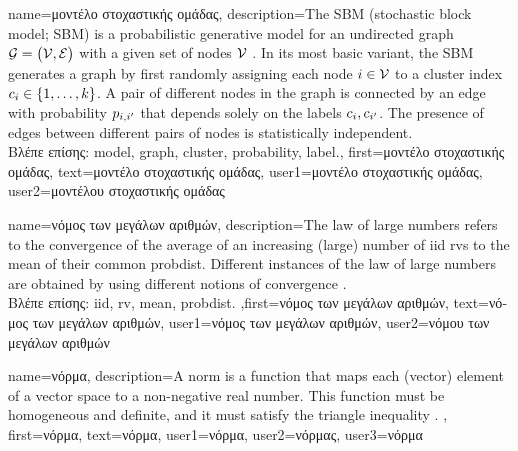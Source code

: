 {name={\foreignlanguage{greek}{μοντέλο στοχαστικής ομάδας}},
	description={The SBM (stochastic block model; SBM) is a 
		probabilistic generative \gls{model} for an undirected \gls{graph} $\mathcal{G} = \big( \mathcal{V}, \mathcal{E} \big)$ 
		with a given set of nodes $\mathcal{V}$ \cite{AbbeSBM2018}. In its most basic variant, 
		the SBM generates a \gls{graph} by first randomly assigning each node $i \in \mathcal{V}$ to 
		a \gls{cluster} index $c_{i} \in \{1,\ldots,k\}$. A pair of different nodes in the 
		\gls{graph} is connected by an edge with \gls{probability} $p_{i,i'}$ that depends 
		solely on the \gls{label}s $c_{i}, c_{i'}$. 
		The presence of edges between different pairs of 
		nodes is statistically independent.\\
		\foreignlanguage{greek}{Βλέπε επίσης:} \gls{model}, \gls{graph}, \gls{cluster}, \gls{probability}, \gls{label}.},
	first={\foreignlanguage{greek}{μοντέλο στοχαστικής ομάδας}},
	text={\foreignlanguage{greek}{μοντέλο στοχαστικής ομάδας}},
	user1={\foreignlanguage{greek}{μοντέλο στοχαστικής ομάδας}}, %
    	user2={\foreignlanguage{greek}{μοντέλου στοχαστικής ομάδας}} %
}

{name={\foreignlanguage{greek}{νόμος των μεγάλων αριθμών}},
	description={The law of large numbers refers to the 
		convergence of the average of an increasing (large) number of \gls{iid} \gls{rv}s 
		to the \gls{mean} of their common \gls{probdist}. Different instances of the 
		law of large numbers are obtained by using different notions of convergence \cite{papoulis}.\\
		\foreignlanguage{greek}{Βλέπε επίσης:} \gls{iid}, \gls{rv}, \gls{mean}, \gls{probdist}.
		},first={\foreignlanguage{greek}{νόμος των μεγάλων αριθμών}},
		text={\foreignlanguage{greek}{νόμος των μεγάλων αριθμών}},
		user1={\foreignlanguage{greek}{νόμος των μεγάλων αριθμών}}, %
		user2={\foreignlanguage{greek}{νόμου των μεγάλων αριθμών}} %
}

{name={\foreignlanguage{greek}{νόρμα}},
	description={A norm is a function that maps each (vector) element 
		of a vector space to a non-negative real number. This function must be 
		homogeneous and definite, and it must satisfy the triangle inequality \cite{HornMatAnalysis}.  },
	first={\foreignlanguage{greek}{νόρμα}},
	text={\foreignlanguage{greek}{νόρμα}},
	user1={\foreignlanguage{greek}{νόρμα}}, %
    	user2={\foreignlanguage{greek}{νόρμας}}, %
	user3={\foreignlanguage{greek}{νόρμα}} %
}

